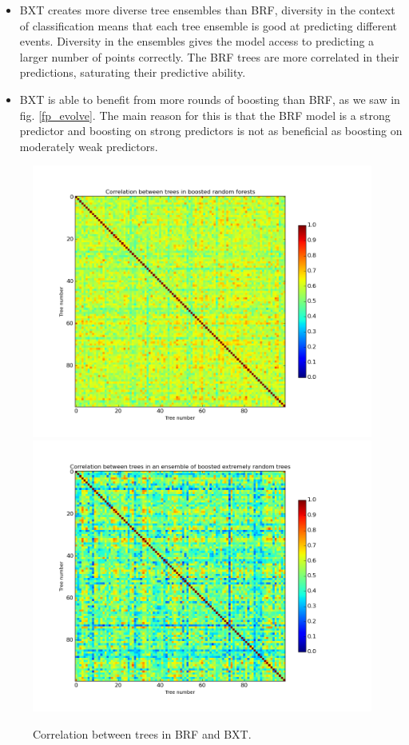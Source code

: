 \begin{itemize}
\item BXT creates more diverse tree ensembles than BRF, diversity in the context of classification means that each tree ensemble is good at predicting different events. Diversity in the ensembles gives the model access to predicting a larger number of points correctly. The BRF trees are more correlated in their predictions, saturating their predictive ability.
\item BXT is able to benefit from more rounds of boosting than BRF, as we saw in fig. \ref{fp_evolve}. The main reason for this is that the BRF model is a strong predictor and boosting on strong predictors is not as beneficial as boosting on moderately weak predictors. 
\end{itemize} 
 
\begin{figure}
\includegraphics[width=\textwidth]{images/BRF_tree_correlation.png}
\includegraphics[width=\textwidth]{images/BXT_tree_correlation.png}
\caption{Correlation between trees in BRF and BXT.}
\label{boosted_correlations}
\end{figure}

